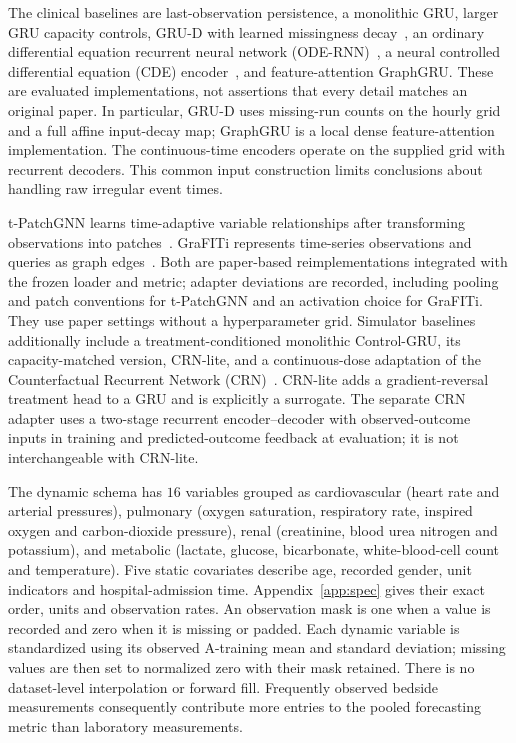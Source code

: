 The clinical baselines are last-observation persistence, a monolithic GRU, larger GRU capacity controls, GRU-D with learned missingness decay~\cite{che2018}, an ordinary differential equation recurrent neural network (ODE-RNN)~\cite{rubanova2019}, a neural controlled differential equation (CDE) encoder~\cite{kidger2020}, and feature-attention GraphGRU. These are evaluated implementations, not assertions that every detail matches an original paper. In particular, GRU-D uses missing-run counts on the hourly grid and a full affine input-decay map; GraphGRU is a local dense feature-attention implementation. The continuous-time encoders operate on the supplied grid with recurrent decoders. This common input construction limits conclusions about handling raw irregular event times.


t-PatchGNN learns time-adaptive variable relationships after transforming observations into patches~\cite{tpatchgnn2024}. GraFITi represents time-series observations and queries as graph edges~\cite{grafiti2024}. Both are paper-based reimplementations integrated with the frozen loader and metric; adapter deviations are recorded, including pooling and patch conventions for t-PatchGNN and an activation choice for GraFITi. They use paper settings without a hyperparameter grid. Simulator baselines additionally include a treatment-conditioned monolithic Control-GRU, its capacity-matched version, CRN-lite, and a continuous-dose adaptation of the Counterfactual Recurrent Network (CRN)~\cite{bica2020}. CRN-lite adds a gradient-reversal treatment head to a GRU and is explicitly a surrogate. The separate CRN adapter uses a two-stage recurrent encoder--decoder with observed-outcome inputs in training and predicted-outcome feedback at evaluation; it is not interchangeable with CRN-lite.


The dynamic schema has $16$ variables grouped as cardiovascular (heart rate and arterial pressures), pulmonary (oxygen saturation, respiratory rate, inspired oxygen and carbon-dioxide pressure), renal (creatinine, blood urea nitrogen and potassium), and metabolic (lactate, glucose, bicarbonate, white-blood-cell count and temperature). Five static covariates describe age, recorded gender, unit indicators and hospital-admission time. Appendix~\ref{app:spec} gives their exact order, units and observation rates. An observation mask is one when a value is recorded and zero when it is missing or padded. Each dynamic variable is standardized using its observed A-training mean and standard deviation; missing values are then set to normalized zero with their mask retained. There is no dataset-level interpolation or forward fill. Frequently observed bedside measurements consequently contribute more entries to the pooled forecasting metric than laboratory measurements.


